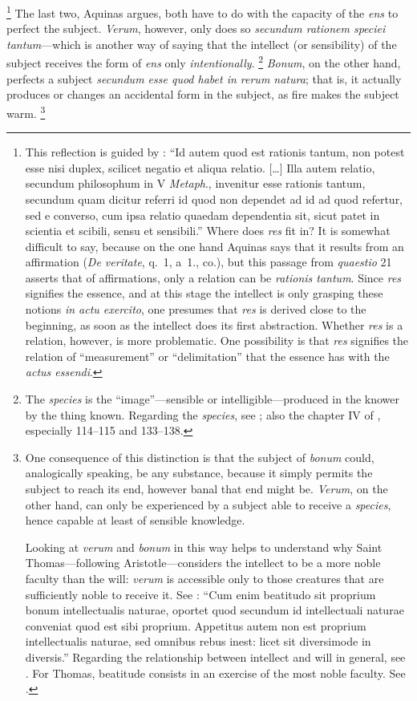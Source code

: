 \footnote{This reflection is guided by \cite[q.~21, a.~1, co.]{st:deveritate}{}: “Id autem quod est rationis tantum, non potest esse nisi duplex, scilicet negatio et aliqua relatio. [\ldots] Illa autem relatio, secundum philosophum in V \emph{Metaph}., invenitur esse rationis tantum, secundum quam dicitur referri id quod non dependet ad id ad quod refertur, sed e converso, cum ipsa relatio quaedam dependentia sit, sicut patet in scientia et scibili, sensu et sensibili.” Where does \emph{res} fit in? It is somewhat difficult to say, because on the one hand Aquinas says that it results from an affirmation (\emph{De veritate}, q.~1, a~1., co.), but this passage from \emph{quaestio} 21 asserts that of affirmations, only a relation can be \emph{rationis tantum}. Since \emph{res} signifies the essence, and at this stage the intellect is only grasping these notions \emph{in actu exercito}, one presumes that \emph{res} is derived close to the beginning, as soon as the intellect does its first abstraction. Whether \emph{res} is a relation, however, is more problematic. One possibility is that \emph{res} signifies the relation of “measurement” or “delimitation” that the essence has with the \emph{actus essendi}.} The last two, Aquinas argues, both have to do with the capacity of the \emph{ens} to perfect the subject. \emph{Verum}, however, only does so \emph{secundum rationem speciei tantum}—which is another way of saying that the intellect (or sensibility) of the subject receives the form of \emph{ens} only \emph{intentionally}.%
%
\footnote{The \emph{species} is the “image”—sensible or intelligible—produced in the knower by the thing known. Regarding the \emph{species}, see \cite[277–279]{definance:etre-et-agir}; also the chapter IV of \cite[73–142]{lucas:hombre}, especially 114–115 and 133–138.}
%
\emph{Bonum}, on the other hand, perfects a subject \emph{secundum esse quod habet in rerum natura}; that is, it actually produces or changes an accidental form in the subject, as fire makes the subject warm.%
%
\footnote{One consequence of this distinction is that the subject of \emph{bonum} could, analogically speaking, be any substance, because it simply permits the subject to reach its end, however banal that end might be. \emph{Verum}, on the other hand, can only be experienced by a subject able to receive a \emph{species}, hence capable at least of sensible knowledge.

Looking at \emph{verum} and \emph{bonum} in this way helps to understand why Saint Thomas—following Aristotle—considers the intellect to be a more noble faculty than the will: \emph{verum} is accessible only to those creatures that are sufficiently noble to receive it.
See \cite[III, cap.~26, n.~8 (Marietti n.~2078)]{st:contragent}: “Cum enim beatitudo sit proprium bonum intellectualis naturae, oportet quod secundum id intellectuali naturae conveniat quod est sibi proprium. Appetitus autem non est proprium intellectualis naturae, sed omnibus rebus inest: licet sit diversimode in diversis.”
Regarding the relationship between intellect and will in general, see \cite[I, q.~82, a.~3]{st:summa}. For Thomas, beatitude consists in an exercise of the most noble faculty. See \cite[378–381]{izquierdo:vita}.}
